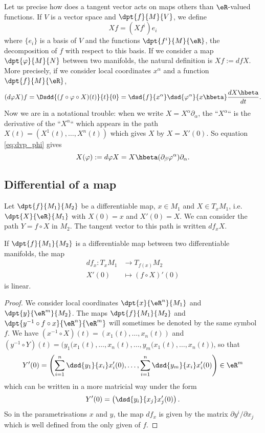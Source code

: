 \label{pg:vecto_vecto}Let us precise how does a tangent vector acts on maps others than $\eR$-valued functions. If $V$ is a vector space and $\dpt{f}{M}{V}$, we define
\[
	Xf=(Xf^i)e_i
\]
where $\{e_i\}$ is a basis of $V$ and the functions $\dpt{f^i}{M}{\eR}$, the decomposition of $f$ with respect to this basis. If we consider a map $\dpt{\varphi}{M}{N}$ between two manifolds, the natural definition is $Xf:=dfX$. More precisely, if we consider local coordinates $x^{\alpha}$ and a function $\dpt{f}{M}{\eR}$,
\begin{equation}\label{eq:dvp_phi}
	(d\varphi X)f=\Dsdd{  (f\circ\varphi\circ X)(t) }{t}{0}=\dsd{f}{x^{\alpha}}\dsd{\varphi^{\alpha}}{x\hbeta}\frac{dX\hbeta}{dt}.
\end{equation}
Now we are in a notational trouble: when we write $X=X^{\alpha}\partial_{\alpha}$, the ``$X^{\alpha}$``{} is the derivative of the ``$X^{\alpha}$``{} which appears in the path $X(t)=(X^1(t),\ldots,X^n(t))$ which gives $X$ by $X=X'(0)$. So equation \eqref{eq:dvp_phi} gives
\begin{equation}
	X(\varphi):=d\varphi X=X\hbeta(\partial_{\beta}\varphi^{\alpha})\partial_{\alpha}.
\end{equation}

\subsection{Differential of a map}

Let $\dpt{f}{M_1}{M_2}$ be a differentiable map, $x\in M_1$ and $X\in T_xM_1$, i.e. $\dpt{X}{\eR}{M_1}$ with $X(0)=x$ and $X'(0)=X$. We can consider the path $Y=f\circ X$ in $M_2$. The tangent vector to this path is written $df_x X$.

\begin{proposition}
	If $\dpt{f}{M_1}{M_2}$ is a differentiable map between two differentiable manifolds, the map
	\begin{equation}
		\begin{aligned}
			df_x \colon T_xM_1 & \to T_{f(x)}M_2        \\
			X'(0)              & \mapsto (f\circ X)'(0)
		\end{aligned}
	\end{equation}
	is linear.
\end{proposition}

\begin{proof}
	We consider local coordinates $\dpt{x}{\eR^n}{M_1}$ and $\dpt{y}{\eR^m}{M_2}$. The maps $\dpt{f}{M_1}{M_2}$ and $\dpt{y^{-1}\circ f\circ x}{\eR^n}{\eR^m}$ will sometimes be denoted by the same symbol $f$. We have $(x^{-1}\circ X)(t)=(x_1(t),\ldots,x_n(t))$ and $(y^{-1}\circ Y)(t)=\big( y_1(x_1(t),\ldots,x_n(t),\ldots, y_m(x_1(t),\ldots,x_n(t)  \big)$, so that
	\[
		Y'(0)=\left(   \sum_{i=1}^n \dsd{y_1}{x_i}x_i'(0),\ldots,\sum_{i=1}^n \dsd{y_m}{x_i}x_i'(0)   \right)\in\eR^m
	\]
	which can be written in a more matricial way under the form
	\[
		Y'(0)=\left( \dsd{y_i}{x_j}x'_j(0) \right).
	\]
	So in the parametrisations $x$ and $y$, the map $df_x$ is given by the matrix $\partial y^i/\partial x_j$ which is well defined from the only given of $f$.
\end{proof}


